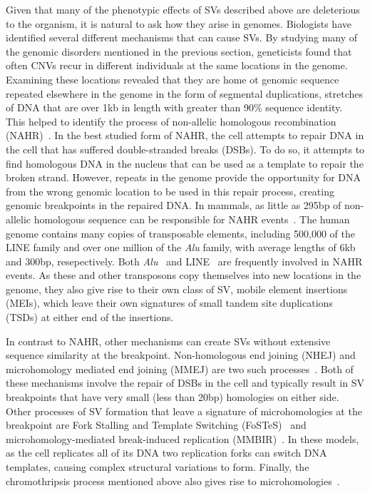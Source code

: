 Given that many of the phenotypic effects of SVs described above are deleterious to the organism, it is natural to ask how they arise in genomes. Biologists have identified several different mechanisms that can cause SVs. By studying many of the genomic disorders mentioned in the previous section, geneticists found that often CNVs recur in different individuals at the same locations in the genome. Examining these locations revealed that they are home ot genomic sequence repeated elsewhere in the genome in the form of segmental duplications, stretches of DNA that are over 1kb in length with greater than 90\% sequence identity\cite{Sharp:2006fy}. This helped to identify the process of non-allelic homologous recombination (NAHR)~\cite{Liu:2012if}. In the best studied form of NAHR, the cell attempts to repair DNA in the cell that has suffered double-stranded breaks (DSBs). To do so, it attempts to find homologous DNA in the nucleus that can be used as a template to repair the broken strand. However, repeats in the genome provide the opportunity for DNA from the wrong genomic location to be used in this repair process, creating genomic breakpoints in the repaired DNA. In mammals, as little as 295bp of non-allelic homologous sequence can be responsible for NAHR events~\cite{Liskay:1987wt}. The human genome contains many copies of transposable elements, including 500,000 of the LINE family and over one million of the \emph{Alu} family, with average lengths of 6kb and 300bp, resepectively. Both \emph{Alu}~\cite{Lehrman:1985tn} and LINE~\cite{Robberecht:2013kw} are frequently involved in NAHR events. As these and other transposons copy themselves into new locations in the genome, they also give rise to their own class of SV, mobile element insertions (MEIs), which leave their own signatures of small tandem site duplications (TSDs) at either end of the insertions.

In contrast to NAHR, other mechanisms can create SVs without extensive sequence similarity at the breakpoint. Non-homologous end joining (NHEJ) and microhomology mediated end joining (MMEJ) are two such processes~\cite{Hastings:2009fv}. Both of these mechanisms involve the repair of DSBs in the cell and typically result in SV breakpoints that have very small (less than 20bp) homologies on either side. Other processes of SV formation that leave a signature of microhomologies at the breakpoint are Fork Stalling and Template Switching (FoSTeS)~\cite{Lee:2007fy} and microhomology-mediated break-induced replication (MMBIR)~\cite{Hastings:2009fv}. In these models, as the cell replicates all of its DNA two replication forks can switch DNA templates, causing complex structural variations to form. Finally, the chromothripsis process mentioned above also gives rise to microhomologies~\cite{Liu:2011p1751}.


